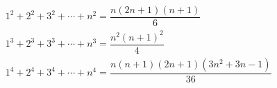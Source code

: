 \begin{align*}
    & 1^2 + 2^2 + 3^2 + \cdots + n^2 = \dfrac{n(2n+1)(n+1)}{6} \\ 
    & 1^3 + 2^3 + 3^3 + \cdots + n^3 = \dfrac{n^2(n+1)^2}{4} \\
    & 1^4 + 2^4 + 3^4 + \cdots + n^4 = \dfrac{n(n+1)(2n+1)(3n^2 + 3n - 1)}{36}
\end{align*}